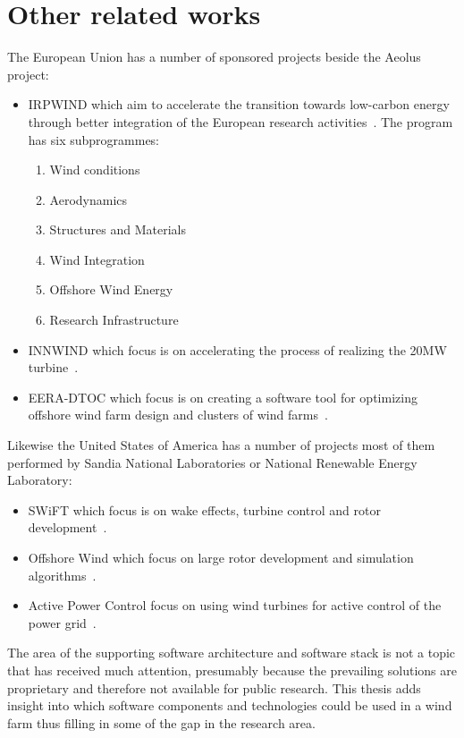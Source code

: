 \section{Other related works}
The European Union has a number of sponsored projects beside the Aeolus project:
\begin{itemize}
	\item IRPWIND which aim to accelerate the transition towards low-carbon energy through better integration of the European research activities~\cite{IRPWIND}. The program has six subprogrammes:
	\begin{enumerate}
		\item Wind conditions
		\item Aerodynamics
		\item Structures and Materials
		\item Wind Integration
		\item Offshore Wind Energy
		\item Research Infrastructure
	\end{enumerate}
	\item INNWIND which focus is on accelerating the process of realizing the 20MW turbine~\cite{INNWIND}.
	\item EERA-DTOC which focus is on creating a software tool for optimizing offshore wind farm design and clusters of wind farms~\cite{eera-dtoc}.
\end{itemize}

Likewise the  United States of America has a number of projects most of them performed by Sandia National Laboratories or National Renewable Energy Laboratory:
\begin{itemize}
	\item SWiFT which focus is on wake effects, turbine control and rotor development~\cite{SWiFT}.
	\item Offshore Wind which focus on large rotor development and simulation algorithms~\cite{offshoreWind}.
	\item Active Power Control focus on using wind turbines for active control of the power grid~\cite{activePowerControl}.
\end{itemize}

The area of the supporting software architecture and software stack is not a topic that has received much attention, presumably because the prevailing solutions are proprietary and therefore not available for public research.
This thesis adds insight into which software components and technologies could be used in a wind farm thus filling in some of the gap in the research area.

